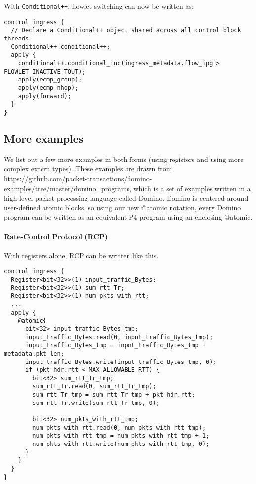 With \texttt{Conditional++}, flowlet switching can now be written as:
\begin{verbatim}
control ingress {
  // Declare a Conditional++ object shared across all control block threads
  Conditional++ conditional++;
  apply {
    conditional++.conditional_inc(ingress_metadata.flow_ipg > FLOWLET_INACTIVE_TOUT);
    apply(ecmp_group);
    apply(ecmp_nhop);
    apply(forward);
  }
}
\end{verbatim}

\subsection{More examples}

We list out a few more examples in both forms (using registers and using more
complex extern types). These examples are drawn from
\url{https://github.com/packet-transactions/domino-examples/tree/master/domino_programs},
which is a set of examples written in a high-level packet-processing language
called Domino. Domino is centered around user-defined atomic blocks, so using
our new @atomic notation, every Domino program can be written as an equivalent
P4 program using an enclosing @atomic.

\paragraph{Rate-Control Protocol (RCP)}

With registers alone, RCP can be written like this.
\begin{verbatim}
control ingress {
  Register<bit<32>>(1) input_traffic_Bytes;
  Register<bit<32>>(1) sum_rtt_Tr;
  Register<bit<32>>(1) num_pkts_with_rtt;
  ...
  apply {
    @atomic{
      bit<32> input_traffic_Bytes_tmp;
      input_traffic_Bytes.read(0, input_traffic_Bytes_tmp);
      input_traffic_Bytes_tmp = input_traffic_Bytes_tmp + metadata.pkt_len;
      input_traffic_Bytes.write(input_traffic_Bytes_tmp, 0);
      if (pkt_hdr.rtt < MAX_ALLOWABLE_RTT) {
        bit<32> sum_rtt_Tr_tmp;
        sum_rtt_Tr.read(0, sum_rtt_Tr_tmp);
        sum_rtt_Tr_tmp = sum_rtt_Tr_tmp + pkt_hdr.rtt;
        sum_rtt_Tr.write(sum_rtt_Tr_tmp, 0);

        bit<32> num_pkts_with_rtt_tmp;
        num_pkts_with_rtt.read(0, num_pkts_with_rtt_tmp);
        num_pkts_with_rtt_tmp = num_pkts_with_rtt_tmp + 1;
        num_pkts_with_rtt.write(num_pkts_with_rtt_tmp, 0);
      }
    }
  }
}
\end{verbatim}


